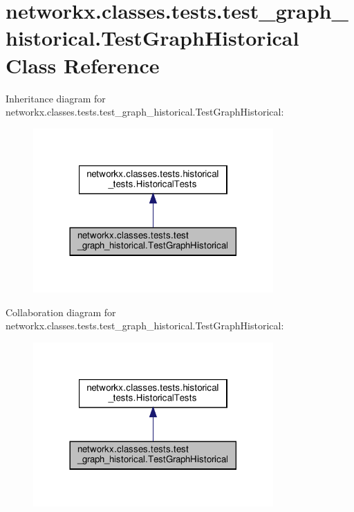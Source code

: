 \hypertarget{classnetworkx_1_1classes_1_1tests_1_1test__graph__historical_1_1TestGraphHistorical}{}\section{networkx.\+classes.\+tests.\+test\+\_\+graph\+\_\+historical.\+Test\+Graph\+Historical Class Reference}
\label{classnetworkx_1_1classes_1_1tests_1_1test__graph__historical_1_1TestGraphHistorical}


Inheritance diagram for networkx.\+classes.\+tests.\+test\+\_\+graph\+\_\+historical.\+Test\+Graph\+Historical\+:
\nopagebreak
\begin{figure}[H]
\begin{center}
\leavevmode
\includegraphics[width=260pt]{classnetworkx_1_1classes_1_1tests_1_1test__graph__historical_1_1TestGraphHistorical__inherit__graph}
\end{center}
\end{figure}


Collaboration diagram for networkx.\+classes.\+tests.\+test\+\_\+graph\+\_\+historical.\+Test\+Graph\+Historical\+:
\nopagebreak
\begin{figure}[H]
\begin{center}
\leavevmode
\includegraphics[width=260pt]{classnetworkx_1_1classes_1_1tests_1_1test__graph__historical_1_1TestGraphHistorical__coll__graph}
\end{center}
\end{figure}
